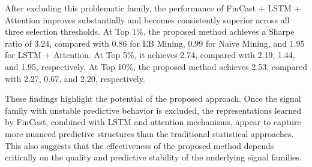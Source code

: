 \documentclass[pdflatex,sn-mathphys-num]{sn-jnl}%
\theoremstyle{thmstyleone}%
\theoremstyle{thmstyletwo}%
\theoremstyle{thmstylethree}%
\begin{document}
After excluding this problematic family, the performance of FinCast + LSTM + Attention improves substantially and becomes consistently superior across all three selection thresholds. At Top 1\%, the proposed method achieves a Sharpe ratio of 3.24, compared with 0.86 for EB Mining, 0.99 for Naive Mining, and 1.95 for LSTM + Attention. At Top 5\%, it achieves 2.74, compared with 2.19, 1.44, and 1.95, respectively. At Top 10\%, the proposed method achieves 2.53, compared with 2.27, 0.67, and 2.20, respectively.

These findings highlight the potential of the proposed approach. Once the signal family with unstable predictive behavior is excluded, the representations learned by FinCast, combined with LSTM and attention mechanisms, appear to capture more nuanced predictive structures than the traditional statistical approaches. This also suggests that the effectiveness of the proposed method depends critically on the quality and predictive stability of the underlying signal families.


\end{document}

